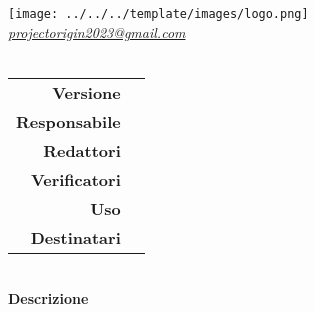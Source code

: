 \thispagestyle{empty}
\renewcommand{\arraystretch}{1.3}

\begin{titlepage}
	\begin{center}
		
	\texttt{[image: ../../../template/images/logo.png]}
	\\[1cm]
	\href{mailto:projectorigin2023@gmail.com}		      	
	{\large{\textit{projectorigin2023@gmail.com} } }\\[2.5cm]
	\Huge \textbf{\doctitle} \\[1cm]
	 \large
			 \begin{tabular}{r|l}
                        \textbf{Versione} & \rev{}\\
                        \textbf{Responsabile} & \resp{} \\
                        \textbf{Redattori} & \red{} \\ 
                        \textbf{Verificatori} &  \ver{} \\
                        \textbf{Uso} & \uso{} \\                        
                        \textbf{Destinatari} & \parbox[t]{5cm}{ \dest{} }
                \end{tabular} 
                \\[3.3cm]
                \large \textbf{Descrizione} \\ \describedoc{} 
     \end{center}
\end{titlepage}